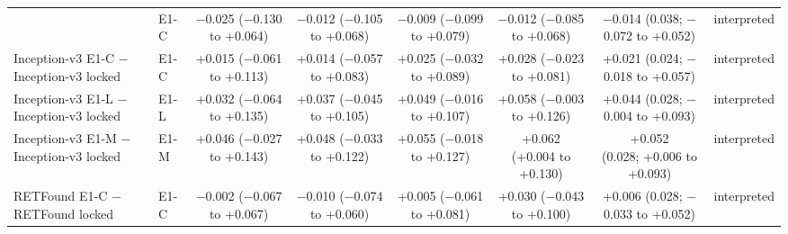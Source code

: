 \begin{longtable}{@{}p{3.6cm}lcccccp{2.6cm}@{}}
 & E1-C & \makecell{$-$0.025\\{\scriptsize ($-$0.130 to +0.064)}} & \makecell{$-$0.012\\{\scriptsize ($-$0.105 to +0.068)}} & \makecell{$-$0.009\\{\scriptsize ($-$0.099 to +0.079)}} & \makecell{$-$0.012\\{\scriptsize ($-$0.085 to +0.068)}} & \makecell{$-$0.014\\{\scriptsize (0.038; $-$0.072 to +0.052)}} & interpreted \\
\addlinespace[2pt]
Inception-v3 E1-C $-$ Inception-v3 locked & E1-C & \makecell{+0.015\\{\scriptsize ($-$0.061 to +0.113)}} & \makecell{+0.014\\{\scriptsize ($-$0.057 to +0.083)}} & \makecell{+0.025\\{\scriptsize ($-$0.032 to +0.089)}} & \makecell{+0.028\\{\scriptsize ($-$0.023 to +0.081)}} & \makecell{+0.021\\{\scriptsize (0.024; $-$0.018 to +0.057)}} & interpreted \\
\addlinespace[2pt]
Inception-v3 E1-L $-$ Inception-v3 locked & E1-L & \makecell{+0.032\\{\scriptsize ($-$0.064 to +0.135)}} & \makecell{+0.037\\{\scriptsize ($-$0.045 to +0.105)}} & \makecell{+0.049\\{\scriptsize ($-$0.016 to +0.107)}} & \makecell{+0.058\\{\scriptsize ($-$0.003 to +0.126)}} & \makecell{+0.044\\{\scriptsize (0.028; $-$0.004 to +0.093)}} & interpreted \\
\addlinespace[2pt]
Inception-v3 E1-M $-$ Inception-v3 locked & E1-M & \makecell{+0.046\\{\scriptsize ($-$0.027 to +0.143)}} & \makecell{+0.048\\{\scriptsize ($-$0.033 to +0.122)}} & \makecell{+0.055\\{\scriptsize ($-$0.018 to +0.127)}} & \makecell{+0.062\\{\scriptsize (+0.004 to +0.130)}} & \makecell{+0.052\\{\scriptsize (0.028; +0.006 to +0.093)}} & interpreted \\
\addlinespace[2pt]
RETFound E1-C $-$ RETFound locked & E1-C & \makecell{$-$0.002\\{\scriptsize ($-$0.067 to +0.067)}} & \makecell{$-$0.010\\{\scriptsize ($-$0.074 to +0.060)}} & \makecell{+0.005\\{\scriptsize ($-$0.061 to +0.081)}} & \makecell{+0.030\\{\scriptsize ($-$0.043 to +0.100)}} & \makecell{+0.006\\{\scriptsize (0.028; $-$0.033 to +0.052)}} & interpreted \\

\end{longtable}
